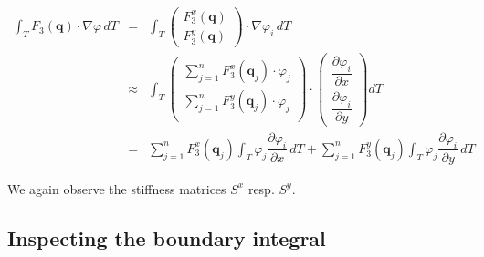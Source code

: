 \documentclass{article}
\newcommand{\pd}[2]{\dfrac{\partial #1}{\partial #2}}
\renewcommand{\phi}{\varphi}
\begin{document}
\begin{eqnarray*}
  \int_T F_3\left(\mathbf{q}\right) \cdot \nabla \phi \, dT & = &
  \int_T
  \begin{pmatrix}
    F_3^x(\mathbf{q}) \\ F_3^y(\mathbf{q})
  \end{pmatrix}
  \cdot \nabla \phi_i \, dT \\
  & \approx & \int_T
  \begin{pmatrix}
    \sum_{j=1}^n F_3^x(\mathbf{q}_j)\cdot \phi_j \\
    \sum_{j=1}^n F_3^y(\mathbf{q}_j)\cdot \phi_j \\
  \end{pmatrix}
  \cdot
  \begin{pmatrix}
    \pd{\phi_i}{x} \\
    \pd{\phi_i}{y}
  \end{pmatrix} dT \\
  & = & \sum_{j=1}^n F_3^x(\mathbf{q}_j) \int_T \phi_j \pd{\phi_i}{x} \, dT
  {} + \sum_{j=1}^n F_3^y(\mathbf{q}_j) \int_T \phi_j \pd{\phi_i}{y} \, dT
\end{eqnarray*}

We again observe the stiffness matrices $S^x$ resp. $S^y$.

\subsection{Inspecting the boundary integral}
\label{sec:boundary-integral}
\end{document}
